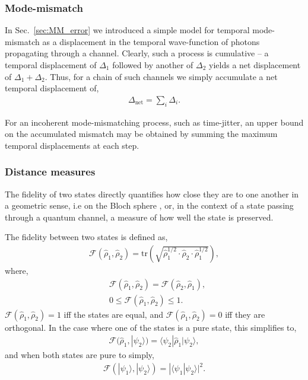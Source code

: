 \documentclass[aps,rmp,twocolumn,amsmath,amssymb,nofootinbib,superscriptaddress,longbibliography,floatfix,table-of-contents,eqsecnum]{revtex4-1}
\newcommand{\bra}[1]{\langle#1|}
\newcommand{\ket}[1]{|#1\rangle}
\begin{document}
%
%

\subsubsection{Mode-mismatch} 

In Sec.~\ref{sec:MM_error} we introduced a simple model for temporal mode-mismatch as a displacement in the temporal wave-function of photons propagating through a channel. Clearly, such a process is cumulative -- a temporal displacement of $\Delta_1$ followed by another of $\Delta_2$ yields a net displacement of \mbox{$\Delta_1+\Delta_2$}. Thus, for a chain of such channels we simply accumulate a net temporal displacement of,
\begin{align}
\Delta_\text{net} = \sum_i \Delta_i.
\end{align}

For an incoherent mode-mismatching process, such as time-jitter, an upper bound on the accumulated mismatch may be obtained by summing the maximum temporal displacements at each step.

%
%

\subsubsection{Distance measures} \label{sec:fid_metric} 

The fidelity of two states directly quantifies how close they are to one another in a geometric sense, i.e on the Bloch sphere \cite{???}, or, in the context of a state passing through a quantum channel, a measure of how well the state is preserved.

The fidelity between two states is defined as,
\begin{align}
\mathcal{F}(\hat\rho_1,\hat\rho_2) = \text{tr}\left(\sqrt{\hat\rho_1^{1/2}\cdot\hat\rho_2\cdot\hat\rho_1^{1/2}}\right),
\end{align}
where,
\begin{align}
& \mathcal{F}(\hat\rho_1,\hat\rho_2) = \mathcal{F}(\hat\rho_2,\hat\rho_1), \nonumber \\
& 0\leq \mathcal{F}(\hat\rho_1,\hat\rho_2) \leq 1.
\end{align}
\mbox{$\mathcal{F}(\hat\rho_1,\hat\rho_2)=1$} iff the states are equal, and \mbox{$\mathcal{F}(\hat\rho_1,\hat\rho_2)=0$} iff they are orthogonal.
In the case where one of the states is a pure state, this simplifies to,
\begin{align}
\mathcal{F}(\hat\rho_1,\ket{\psi_2}) = \bra{\psi_2}\hat\rho_1\ket{\psi_2},
\end{align}
and when both states are pure to simply,
\begin{align}
\mathcal{F}(\ket{\psi_1},\ket{\psi_2}) = |\langle\psi_1 | \psi_2\rangle|^2.
\end{align}
\end{document}
